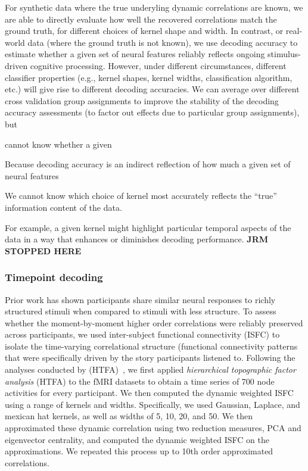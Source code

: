




For synthetic data where the true underyling dynamic correlations are
known, we are able to directly evaluate how well the recovered
correlations match the ground truth, for different choices of kernel
shape and width.  In contrast, or real-world data (where the ground
truth is not known), we use decoding accuracy to estimate whether a
given set of neural features reliably reflects ongoing stimulus-driven
cognitive processing.  However, under different circumstances,
different classifier properties (e.g., kernel shapes, kernel widths,
classification algorithm, etc.) will give rise to different decoding
accuracies.  We can average over different cross validation group
assignments to improve the stability of the decoding accuracy
assessments (to factor out effects due to particular group
assignments), but 

cannot know whether a given 


Because decoding accuracy is an indirect
reflection of how much a given set of neural features 

We cannot know which choice of kernel most accurately
reflects the ``true'' information content of the data.

For example, a
given kernel might highlight particular temporal aspects of the data
in a way that enhances or diminishes decoding performance.
\textbf{JRM STOPPED HERE}


\subsubsection*{Timepoint decoding}

Prior work has shown participants share similar neural responses to
richly structured stimuli when compared to stimuli with less
structure.  To assess whether the moment-by-moment higher order
correlations were reliably preserved across participants, we used
inter-subject functional connectivity (ISFC) to isolate the
time-varying correlational structure (functional connectivity patterns
that were specifically driven by the story participants listened to.
Following the analyses conducted by (HTFA)~\cite{MannEtal18}, we first
applied \textit{hierarchical topographic factor analysis} (HTFA) to
the fMRI datasets to obtain a time series of 700 node activities for
every participant.  We then computed the dynamic weighted ISFC using a
range of kernels and widths.  Specifically, we used Gaussian, Laplace,
and mexican hat kernels, as well as widths of 5, 10, 20, and 50.  We
then approximated these dynamic correlation using two reduction measures, PCA and eigenvector centrality, and computed the dynamic weighted ISFC on the approximations.  We repeated this process up to 10th order approximated correlations.  

